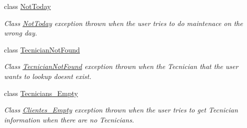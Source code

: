 \begin{DoxyCompactItemize}
class \hyperlink{class_companhia_1_1_not_today}{Not\+Today}
\begin{DoxyCompactList}\small\item\em Class \hyperlink{class_companhia_1_1_not_today}{Not\+Today} exception thrown when the user tries to do maintenace on the wrong day. \end{DoxyCompactList}\item 
class \hyperlink{class_companhia_1_1_tecnician_not_found}{Tecnician\+Not\+Found}
\begin{DoxyCompactList}\small\item\em Class \hyperlink{class_companhia_1_1_tecnician_not_found}{Tecnician\+Not\+Found} exception thrown when the Tecnician that the user wants to lookup doesn\textquotesingle{}t exist. \end{DoxyCompactList}\item 
class \hyperlink{class_companhia_1_1_tecnicians___empty}{Tecnicians\+\_\+\+Empty}
\begin{DoxyCompactList}\small\item\em Class \hyperlink{class_companhia_1_1_clientes___empty}{Clientes\+\_\+\+Empty} exception thrown when the user tries to get Tecnician information when there are no Tecnicians. \end{DoxyCompactList}\end{DoxyCompactItemize}
